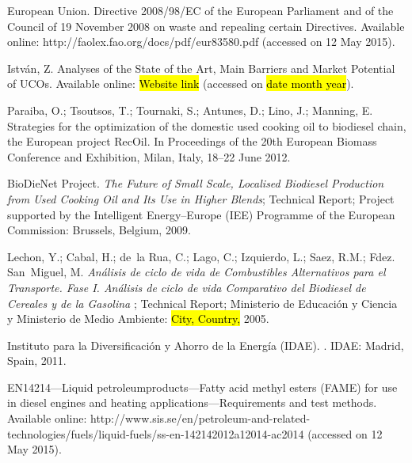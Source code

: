 \documentclass[sustainability,article,accept,moreauthors,pdftex,12pt,a4paper]{mdpi}
\begin{document}
\begin{thebibliography}{----}
{European Union}.
\newblock Directive 2008/98/EC of the European Parliament and of the Council of
 19 November 2008 on waste and repealing certain Directives. Available online: http://faolex.fao.org/docs/pdf/eur83580.pdf (accessed on 12 May 2015).

Istv\'an, Z.
\newblock Analyses of the State of the Art, Main Barriers and Market Potential
 of UCOs. Available online: \hl{Website link } (accessed on \hl{date month year}).

Paraiba, O.; Tsoutsos, T.; Tournaki, S.; Antunes, D.; Lino, J.; Manning, E.
\newblock Strategies for the optimization of the domestic used cooking oil to
 biodiesel chain, the European project RecOil.
\newblock In Proceedings of the 20th European Biomass Conference and Exhibition, Milan, Italy, 18--22 June 2012. 


{BioDieNet Project}.
\newblock \textit{The Future of Small Scale, Localised Biodiesel Production from Used
Cooking Oil and Its Use in Higher Blends};
\newblock Technical Report; Project supported by the Intelligent Energy--Europe (IEE) Programme of the European Commission: Brussels, Belgium, 2009.

Lechon, Y.; Cabal, H.; de~la Rua, C.; Lago, C.; Izquierdo, L.; Saez, R.M.;
 Fdez. San~Miguel, M.
\newblock \textit{An\'alisis de ciclo de vida de Combustibles Alternativos para el
Transporte. Fase I. An\'alisis de ciclo de vida Comparativo del Biodiesel de
Cereales y de la Gasolina
};
\newblock Technical Report; Ministerio de Educaci\'on y Ciencia y Ministerio de
 Medio Ambiente: \hl{City, Country,} 2005.

Instituto para la Diversificación y Ahorro de la Energ\'ia (IDAE).
. IDAE: Madrid, Spain, 2011.

EN14214---Liquid petroleumproducts---Fatty acid methyl esters (FAME) for use in diesel engines and 
heating applications---Requirements and test methods.
\newblock Available online: http://www.sis.se/en/\linebreak petroleum-and-related-technologies/fuels/liquid-fuels/ss-en-142142012a12014-ac2014 (accessed on 12 May 2015).


\end{thebibliography}
\end{document}
